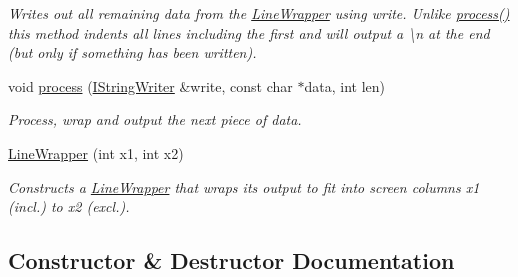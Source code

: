 \begin{DoxyCompactItemize}
\begin{DoxyCompactList}\small\item\em Writes out all remaining data from the \hyperlink{classxmem_1_1config_1_1third__party_1_1_print_usage_implementation_1_1_line_wrapper}{Line\+Wrapper} using {\ttfamily write}. Unlike \hyperlink{classxmem_1_1config_1_1third__party_1_1_print_usage_implementation_1_1_line_wrapper_ad8bdb1f9269d88487105199d23bb641f}{process()} this method indents all lines including the first and will output a \textbackslash{}n at the end (but only if something has been written). \end{DoxyCompactList}\item 
void \hyperlink{classxmem_1_1config_1_1third__party_1_1_print_usage_implementation_1_1_line_wrapper_ad8bdb1f9269d88487105199d23bb641f}{process} (\hyperlink{structxmem_1_1config_1_1third__party_1_1_print_usage_implementation_1_1_i_string_writer}{I\+String\+Writer} \&write, const char $\ast$data, int len)
\begin{DoxyCompactList}\small\item\em Process, wrap and output the next piece of data. \end{DoxyCompactList}\item 
\hyperlink{classxmem_1_1config_1_1third__party_1_1_print_usage_implementation_1_1_line_wrapper_a17ff253c8a833dc8547f98999ac2a5c6}{Line\+Wrapper} (int x1, int x2)
\begin{DoxyCompactList}\small\item\em Constructs a \hyperlink{classxmem_1_1config_1_1third__party_1_1_print_usage_implementation_1_1_line_wrapper}{Line\+Wrapper} that wraps its output to fit into screen columns {\ttfamily x1} (incl.) to {\ttfamily x2} (excl.). \end{DoxyCompactList}\end{DoxyCompactItemize}


\subsection{Constructor \& Destructor Documentation}
\hypertarget{classxmem_1_1config_1_1third__party_1_1_print_usage_implementation_1_1_line_wrapper_a17ff253c8a833dc8547f98999ac2a5c6}{}
